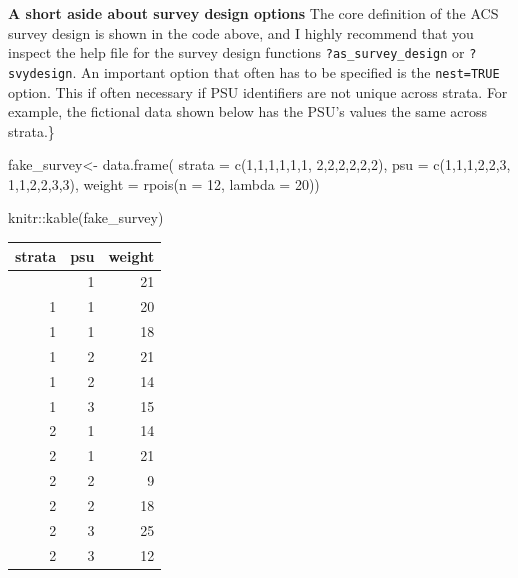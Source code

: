 \documentclass[
  letterpaper,
  DIV=11,
  numbers=noendperiod]{scrreprt}
\newenvironment{Shaded}{\begin{snugshade}}{\end{snugshade}}
\newcommand{\AttributeTok}[1]{\textcolor[rgb]{0.40,0.45,0.13}{#1}}
\newcommand{\DecValTok}[1]{\textcolor[rgb]{0.68,0.00,0.00}{#1}}
\newcommand{\FunctionTok}[1]{\textcolor[rgb]{0.28,0.35,0.67}{#1}}
\newcommand{\NormalTok}[1]{\textcolor[rgb]{0.00,0.23,0.31}{#1}}
\newcommand{\OtherTok}[1]{\textcolor[rgb]{0.00,0.23,0.31}{#1}}
\newcommand{\SpecialCharTok}[1]{\textcolor[rgb]{0.37,0.37,0.37}{#1}}
\begin{document}
\textbf{A short aside about survey design options} The core definition
of the ACS survey design is shown in the code above, and I highly
recommend that you inspect the help file for the survey design functions
\texttt{?as\_survey\_design} or \texttt{?svydesign}. An important option
that often has to be specified is the \texttt{nest=TRUE} option. This if
often necessary if PSU identifiers are not unique across strata. For
example, the fictional data shown below has the PSU's values the same
across strata.\}

\begin{Shaded}
\begin{Highlighting}[]
\NormalTok{fake\_survey}\OtherTok{\textless{}{-}} \FunctionTok{data.frame}\NormalTok{(}
  \AttributeTok{strata =} \FunctionTok{c}\NormalTok{(}\DecValTok{1}\NormalTok{,}\DecValTok{1}\NormalTok{,}\DecValTok{1}\NormalTok{,}\DecValTok{1}\NormalTok{,}\DecValTok{1}\NormalTok{,}\DecValTok{1}\NormalTok{,}
             \DecValTok{2}\NormalTok{,}\DecValTok{2}\NormalTok{,}\DecValTok{2}\NormalTok{,}\DecValTok{2}\NormalTok{,}\DecValTok{2}\NormalTok{,}\DecValTok{2}\NormalTok{),}
  \AttributeTok{psu =} \FunctionTok{c}\NormalTok{(}\DecValTok{1}\NormalTok{,}\DecValTok{1}\NormalTok{,}\DecValTok{1}\NormalTok{,}\DecValTok{2}\NormalTok{,}\DecValTok{2}\NormalTok{,}\DecValTok{3}\NormalTok{,}
          \DecValTok{1}\NormalTok{,}\DecValTok{1}\NormalTok{,}\DecValTok{2}\NormalTok{,}\DecValTok{2}\NormalTok{,}\DecValTok{3}\NormalTok{,}\DecValTok{3}\NormalTok{),}
  \AttributeTok{weight =} \FunctionTok{rpois}\NormalTok{(}\AttributeTok{n =} \DecValTok{12}\NormalTok{, }\AttributeTok{lambda =} \DecValTok{20}\NormalTok{))}

\NormalTok{knitr}\SpecialCharTok{::}\FunctionTok{kable}\NormalTok{(fake\_survey)}
\end{Highlighting}
\end{Shaded}

\begin{longtable}[]{@{}rrr@{}}
\toprule\noalign{}
strata & psu & weight \\
\midrule\noalign{}
\endhead
\bottomrule\noalign{}
\endlastfoot
1 & 1 & 21 \\
1 & 1 & 20 \\
1 & 1 & 18 \\
1 & 2 & 21 \\
1 & 2 & 14 \\
1 & 3 & 15 \\
2 & 1 & 14 \\
2 & 1 & 21 \\
2 & 2 & 9 \\
2 & 2 & 18 \\
2 & 3 & 25 \\
2 & 3 & 12 \\
\end{longtable}
\end{document}

